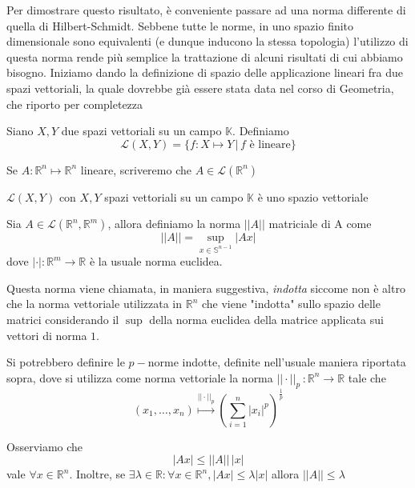 Per dimostrare questo risultato, è conveniente passare ad una norma differente di quella di Hilbert-Schmidt. Sebbene tutte le norme, in uno spazio finito dimensionale sono equivalenti (e dunque inducono la stessa topologia) l'utilizzo di questa norma rende più semplice la trattazione
di alcuni risultati di cui abbiamo bisogno. Iniziamo dando la definizione di spazio delle applicazione lineari fra due spazi vettoriali, la quale dovrebbe già essere stata data nel corso di Geometria, che riporto per completezza
\begin{definition}
    Siano $X, Y$ due spazi vettoriali su un campo $\mathbb{K}$. Definiamo
    $$
    \mathcal{L}(X, Y) = \{f: X \mapsto Y \, | \, f \text{ è lineare} \}
    $$
\end{definition}
\begin{remark}
    Se $A : \mathbb{R}^n \mapsto \mathbb{R}^n$ lineare, scriveremo che $A \in \mathcal{L}(\mathbb{R}^n)$
\end{remark}
\begin{remark}
    $\mathcal{L}(X, Y)$ con $X, Y$ spazi vettoriali su un campo $\mathbb{K}$ è uno spazio vettoriale
\end{remark}
\begin{definition}
    Sia $A \in \mathcal{L}(\mathbb{R}^n, \mathbb{R}^m)$, allora definiamo la norma $|| A ||$ matriciale di A come
    \begin{equation}
        || A || = \sup_{x \in \mathbb{S}^{n-1}} |Ax|
    \end{equation}
    dove $|\cdot|:\mathbb{R}^m \to \mathbb{R}$ è la usuale norma euclidea.
\end{definition}
\begin{remark}
    Questa norma viene chiamata, in maniera suggestiva, \emph{indotta} siccome non è altro che la norma vettoriale utilizzata in $\mathbb{R}^n$ che viene "indotta" sullo spazio delle matrici considerando il $\sup$ della norma euclidea della matrice applicata sui vettori di norma $1$.
\end{remark}
\begin{remark}
    Si potrebbero definire le $p-$norme indotte, definite nell'usuale maniera riportata sopra, dove si utilizza come norma vettoriale la norma $|| \cdot ||_p \, : \mathbb{R}^n \to \mathbb{R}$ tale che
    $$
    (x_1, \ldots, x_n) \stackrel{||\cdot||_p}{\mapsto} \left( \sum_{i=1}^n |x_i|^p \right)^{\frac{1}{p}}
    $$
\end{remark}
\begin{remark}
    Osserviamo che
    \begin{equation}
    |Ax| \leq || A || \, |x|
    \label{eq:matrix_norm_inequality}
    \end{equation}
    vale $\forall x \in \mathbb{R}^n$. Inoltre, se $\exists \lambda \in \mathbb{R} : \forall x \in \mathbb{R}^n, |Ax| \leq \lambda |x|$ allora $|| A || \leq \lambda$
\end{remark}
